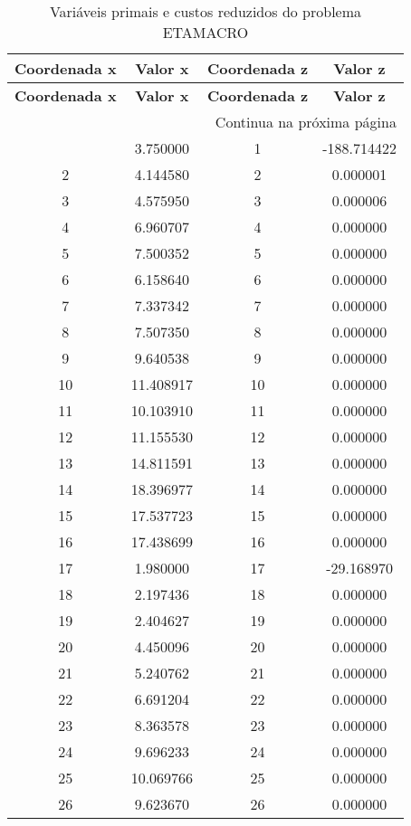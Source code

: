 \documentclass[12pt]{article}
\begin{document}
\begin{longtable}{@{}cccc@{}}
\caption{Variáveis primais e custos reduzidos do problema ETAMACRO} \\
\toprule
\textbf{Coordenada x} & \textbf{Valor x} & \textbf{Coordenada z} & \textbf{Valor z} \\
\midrule
\endfirsthead

\toprule
\textbf{Coordenada x} & \textbf{Valor x} & \textbf{Coordenada z} & \textbf{Valor z} \\
\midrule
\endhead

\midrule \multicolumn{4}{r}{{Continua na próxima página}} \\ \midrule
\endfoot

\bottomrule
\endlastfoot
1 & 3.750000 & 1 & -188.714422 \\
2 & 4.144580 & 2 & 0.000001 \\
3 & 4.575950 & 3 & 0.000006 \\
4 & 6.960707 & 4 & 0.000000 \\
5 & 7.500352 & 5 & 0.000000 \\
6 & 6.158640 & 6 & 0.000000 \\
7 & 7.337342 & 7 & 0.000000 \\
8 & 7.507350 & 8 & 0.000000 \\
9 & 9.640538 & 9 & 0.000000 \\
10 & 11.408917 & 10 & 0.000000 \\
11 & 10.103910 & 11 & 0.000000 \\
12 & 11.155530 & 12 & 0.000000 \\
13 & 14.811591 & 13 & 0.000000 \\
14 & 18.396977 & 14 & 0.000000 \\
15 & 17.537723 & 15 & 0.000000 \\
16 & 17.438699 & 16 & 0.000000 \\
17 & 1.980000 & 17 & -29.168970 \\
18 & 2.197436 & 18 & 0.000000 \\
19 & 2.404627 & 19 & 0.000000 \\
20 & 4.450096 & 20 & 0.000000 \\
21 & 5.240762 & 21 & 0.000000 \\
22 & 6.691204 & 22 & 0.000000 \\
23 & 8.363578 & 23 & 0.000000 \\
24 & 9.696233 & 24 & 0.000000 \\
25 & 10.069766 & 25 & 0.000000 \\
26 & 9.623670 & 26 & 0.000000 \\

\end{longtable}
\end{document}
